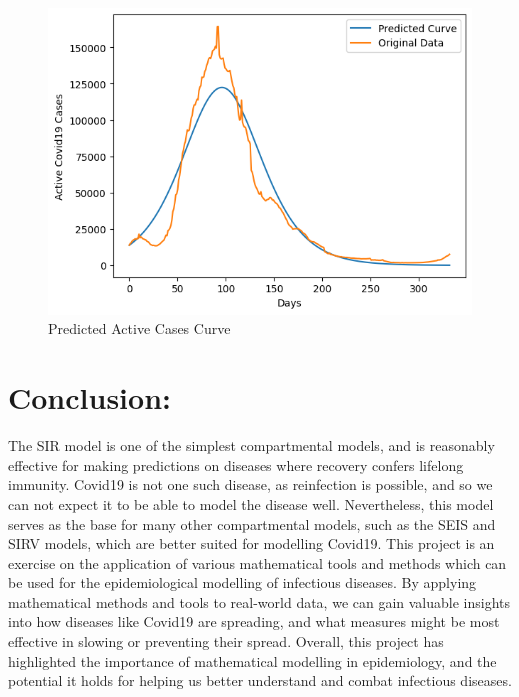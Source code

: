 \documentclass[letterpaper,12pt]{report}
\begin{document}
\begin{figure}[H]
\centering
\includegraphics[scale=0.9]{Prediction+Data.png}
\caption{Predicted Active Cases Curve}
\end{figure}

\section*{\large Conclusion:}
The SIR model is one of the simplest compartmental models, and is reasonably effective for making predictions on diseases where recovery confers lifelong immunity. Covid19 is not one such disease, as reinfection is possible, and so we can not expect it to be able to model the disease well. Nevertheless, this model serves as the base for many other compartmental models, such as the SEIS and SIRV models, which are better suited for modelling Covid19. This project is an exercise on the application of various mathematical tools and methods which can be used for the epidemiological modelling of infectious diseases. By applying mathematical methods and tools to real-world data, we can gain valuable insights into how diseases like Covid19 are spreading, and what measures might be most effective in slowing or preventing their spread. Overall, this project has highlighted the importance of mathematical modelling in epidemiology, and the potential it holds for helping us better understand and combat infectious diseases.
\end{document}
